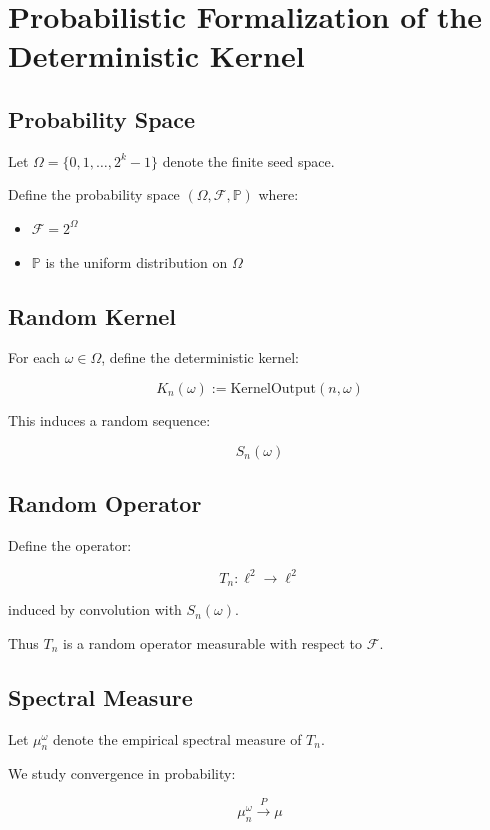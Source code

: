 \section{Probabilistic Formalization of the Deterministic Kernel}

\subsection{Probability Space}

Let $\Omega = \{0,1,\dots,2^k-1\}$ denote the finite seed space.

Define the probability space $(\Omega, \mathcal{F}, \mathbb{P})$ where:

\begin{itemize}
\item $\mathcal{F} = 2^\Omega$
\item $\mathbb{P}$ is the uniform distribution on $\Omega$
\end{itemize}

\subsection{Random Kernel}

For each $\omega \in \Omega$, define the deterministic kernel:

\[
K_n(\omega) := \text{KernelOutput}(n, \omega)
\]

This induces a random sequence:

\[
S_n(\omega)
\]

\subsection{Random Operator}

Define the operator:

\[
T_n : \ell^2 \to \ell^2
\]

induced by convolution with $S_n(\omega)$.

Thus $T_n$ is a random operator measurable with respect to $\mathcal{F}$.

\subsection{Spectral Measure}

Let $\mu_n^\omega$ denote the empirical spectral measure of $T_n$.

We study convergence in probability:

\[
\mu_n^\omega \xrightarrow{P} \mu
\]

